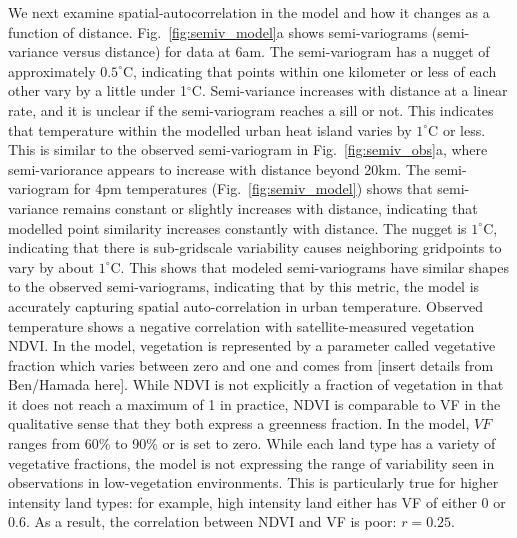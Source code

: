 \documentclass[draft,linenumbers]{agujournal}
\begin{document}
We next examine spatial-autocorrelation in the model and how it changes as a function of distance. Fig.~\ref{fig:semiv_model}a shows semi-variograms (semi-variance versus distance) for data at 6am. The semi-variogram has a nugget of approximately $0.5^\circ$C, indicating that points within one kilometer or less of each other vary by a little under 1$^\circ$C. Semi-variance increases with distance at a linear rate, and it is unclear if the semi-variogram reaches a sill or not. This indicates that temperature within the modelled urban heat island varies by $1^\circ$C or less. This is similar to the observed semi-variogram in Fig.~\ref{fig:semiv_obs}a, where semi-variorance appears to increase with distance beyond 20km. The semi-variogram for 4pm temperatures (Fig.~\ref{fig:semiv_model}) shows that semi-variance remains constant or slightly increases with distance, indicating that modelled point similarity increases constantly with distance. The nugget is $1^\circ$C, indicating that there is sub-gridscale variability causes neighboring gridpoints to vary by about $1^\circ$C. 
This shows that modeled semi-variograms have similar shapes to the observed semi-variograms, indicating that by this metric, the model is accurately capturing spatial auto-correlation in urban temperature. %
Observed temperature shows a negative correlation with satellite-measured vegetation NDVI. In the model, vegetation is represented by a parameter called vegetative fraction which varies between zero and one and comes from [insert details from Ben/Hamada here]. 
While NDVI is not explicitly a fraction of vegetation in that it does not reach a maximum of 1 in practice, NDVI is comparable to VF in the qualitative sense that they both express a greenness fraction. In the model, $VF$ ranges from 60\% to 90\% or is set to zero. While each land type has a variety of vegetative fractions, the model is not expressing the range of variability seen in observations in low-vegetation environments. This is particularly true for higher intensity land types: for example, high intensity land either has VF of either 0 or 0.6. As a result, the correlation between NDVI and VF is poor: $r=0.25$. 
\end{document}
